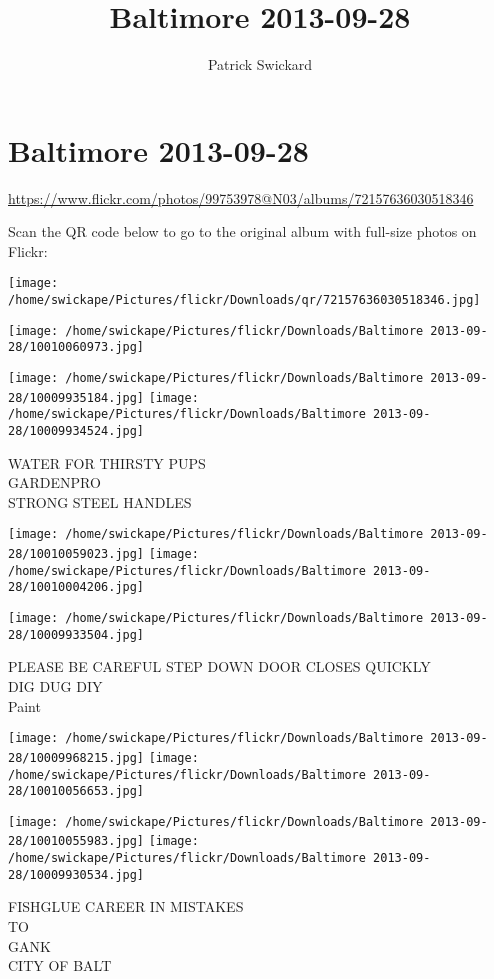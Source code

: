 \documentclass[10pt,letterpaper]{article}
\title{Baltimore 2013-09-28}
\author{Patrick Swickard}
\date{}
\begin{document}
\section*{Baltimore 2013-09-28}

\url{https://www.flickr.com/photos/99753978@N03/albums/72157636030518346}

Scan the QR code below to go to the original album with full-size photos on Flickr:

\texttt{[image: /home/swickape/Pictures/flickr/Downloads/qr/72157636030518346.jpg]}
\pagebreak

\texttt{[image: /home/swickape/Pictures/flickr/Downloads/Baltimore 2013-09-28/10010060973.jpg]}

\vspace{0.25in}
\texttt{[image: /home/swickape/Pictures/flickr/Downloads/Baltimore 2013-09-28/10009935184.jpg]}
\texttt{[image: /home/swickape/Pictures/flickr/Downloads/Baltimore 2013-09-28/10009934524.jpg]}

WATER FOR THIRSTY PUPS\\
GARDENPRO\\
STRONG STEEL HANDLES
\pagebreak

\texttt{[image: /home/swickape/Pictures/flickr/Downloads/Baltimore 2013-09-28/10010059023.jpg]}
\texttt{[image: /home/swickape/Pictures/flickr/Downloads/Baltimore 2013-09-28/10010004206.jpg]}

\vspace{0.25in}
\texttt{[image: /home/swickape/Pictures/flickr/Downloads/Baltimore 2013-09-28/10009933504.jpg]}

PLEASE BE CAREFUL STEP DOWN DOOR CLOSES QUICKLY\\
DIG DUG DIY\\
Paint
\pagebreak

\texttt{[image: /home/swickape/Pictures/flickr/Downloads/Baltimore 2013-09-28/10009968215.jpg]}
\texttt{[image: /home/swickape/Pictures/flickr/Downloads/Baltimore 2013-09-28/10010056653.jpg]}

\texttt{[image: /home/swickape/Pictures/flickr/Downloads/Baltimore 2013-09-28/10010055983.jpg]}
\texttt{[image: /home/swickape/Pictures/flickr/Downloads/Baltimore 2013-09-28/10009930534.jpg]}

FISHGLUE CAREER IN MISTAKES\\
TO\\
GANK\\
CITY OF BALT
\pagebreak
\end{document}
